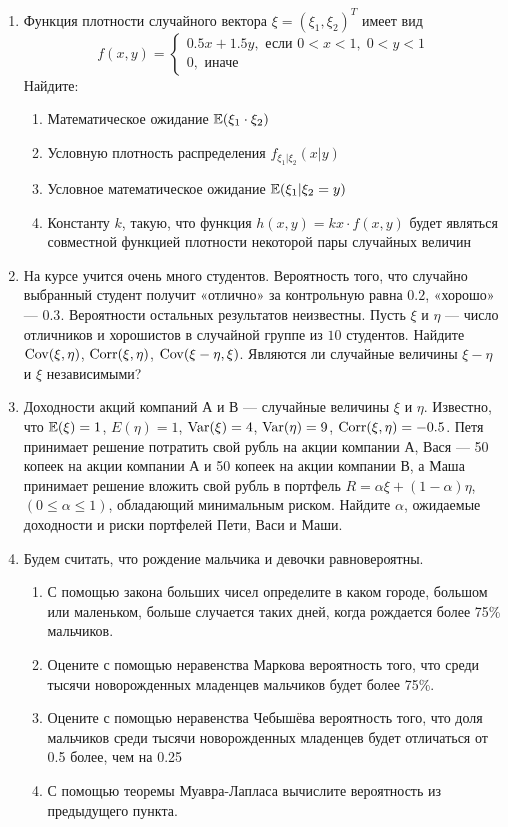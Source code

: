 \documentclass[12pt, a4paper]{article}\usepackage[]{graphicx}\usepackage[]{color}
\begin{document}
				\begin{enumerate}
					\item Функция плотности случайного вектора $\xi=(\xi_1, \xi_2)^T$ имеет вид
					\[
					f(x,y)=\begin{cases}
					0.5x + 1.5y, \text{ если } 0<x<1, \; 0<y<1 \\
					0, \text{ иначе }
					\end{cases}
					\]
					Найдите:
					\begin{enumerate}
						\item Математическое ожидание $\mathbb{E}(\xi_1 \cdot \xi_2)$
						\item Условную плотность распределения $f_{\xi_1|\xi_2} (x|y)$
						\item Условное математическое ожидание $\mathbb{E}(\xi_1| \xi_2=y)$
						\item Константу $k$, такую, что функция $h(x,y)=kx\cdot f(x,y)$ будет являться совместной функцией плотности некоторой пары случайных величин
					\end{enumerate}

					\item На курсе учится очень много студентов. Вероятность того, что случайно выбранный студент получит «отлично» за контрольную равна $0.2$, «хорошо» — $0.3$. Вероятности остальных результатов неизвестны. Пусть $\xi$ и $\eta$ — число отличников и хорошистов в случайной группе из $10$ студентов. Найдите $\operatorname{Cov}(\xi,\eta)$, $\operatorname{Corr}(\xi,\eta)$, $\operatorname{Cov}(\xi-\eta,\xi)$. Являются ли случайные величины $\xi-\eta$ и $\xi$ независимыми?

					\item Доходности акций компаний А и В — случайные величины $\xi$ и $\eta$. Известно, что $\mathbb{E}(\xi)=1$, $E(\eta)=1$, $\operatorname{Var}(\xi)=4$, $\operatorname{Var}(\eta)=9$, $\operatorname{Corr}(\xi,\eta)=-0.5$. Петя принимает решение потратить свой рубль на акции компании А, Вася — 50 копеек на акции компании А и 50 копеек на акции компании В, а Маша  принимает решение вложить свой рубль в портфель $R=\alpha\xi+(1-\alpha)\eta$, $(0 \leq \alpha \leq 1)$, обладающий минимальным риском. Найдите $\alpha$, ожидаемые доходности и риски портфелей Пети, Васи и Маши.

					\item Будем считать, что рождение мальчика и девочки равновероятны.
					\begin{enumerate}
						\item С помощью закона больших чисел определите в каком городе, большом или маленьком, больше случается таких дней, когда рождается более 75\% мальчиков.
						\item Оцените с помощью неравенства Маркова вероятность того, что среди тысячи новорожденных младенцев мальчиков будет более 75\%.
						\item Оцените с помощью неравенства Чебышёва вероятность того, что доля мальчиков среди тысячи новорожденных младенцев будет отличаться от 0.5 более, чем на 0.25
						\item С помощью теоремы Муавра-Лапласа вычислите вероятность из предыдущего пункта.
					\end{enumerate}


\end{enumerate}
\end{document}
